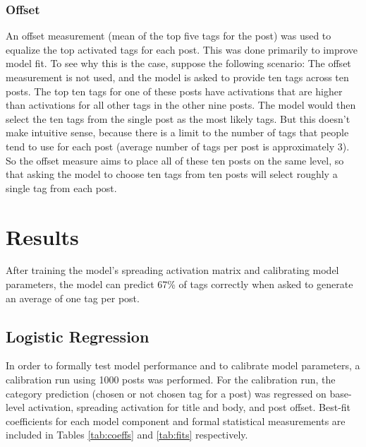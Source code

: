 \documentclass[10pt,letterpaper]{article}
\begin{document}
\subsubsection{Offset}

An offset measurement (mean of the top five tags for the post) was used to equalize the top activated tags for each post.
This was done primarily to improve model fit.
To see why this is the case, suppose the following scenario:
The offset measurement is not used, and the model is asked to provide ten tags across ten posts.
The top ten tags for one of these posts have activations that are higher than activations for all other tags in the other nine posts.
The model would then select the ten tags from the single post as the most likely tags.
But this doesn't make intuitive sense, because there is a limit to the number of tags that people tend to use for each post (average number of tags per post is approximately 3).
So the offset measure aims to place all of these ten posts on the same level, so that asking the model to choose ten tags from ten posts will select roughly a single tag from each post.

\section{Results}

After training the model's spreading activation matrix and calibrating model parameters, the model can predict 67\% of tags correctly when asked to generate an average of one tag per post.

\subsection{Logistic Regression}

In order to formally test model performance and to calibrate model parameters, a calibration run using \num{1000} posts was performed.
For the calibration run, the category prediction (chosen or not chosen tag for a post) was regressed on base-level activation, spreading activation for title and body, and post offset.
Best-fit coefficients for each model component and formal statistical measurements are included in Tables \ref{tab:coeffs} and \ref{tab:fits} respectively.
\end{document}
